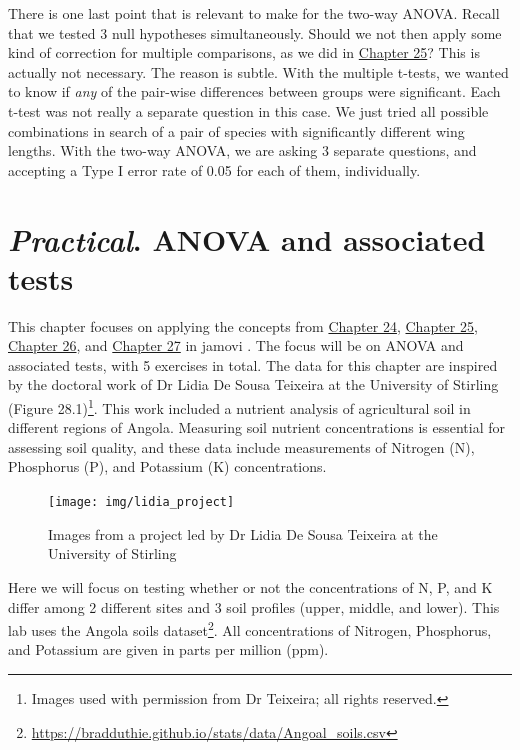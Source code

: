 \documentclass[
]{scrbook}
\begin{document}
There is one last point that is relevant to make for the two-way ANOVA.
Recall that we tested 3 null hypotheses simultaneously.
Should we not then apply some kind of correction for multiple comparisons, as we did in \protect\hyperlink{Chapter_25}{Chapter 25}?
This is actually not necessary.
The reason is subtle.
With the multiple t-tests, we wanted to know if \emph{any} of the pair-wise differences between groups were significant.
Each t-test was not really a separate question in this case.
We just tried all possible combinations in search of a pair of species with significantly different wing lengths.
With the two-way ANOVA, we are asking 3 separate questions, and accepting a Type I error rate of 0.05 for each of them, individually.

\hypertarget{Chapter_28}{%
\chapter{\texorpdfstring{\emph{Practical}. ANOVA and associated tests}{Practical. ANOVA and associated tests}}\label{Chapter_28}}

This chapter focuses on applying the concepts from \protect\hyperlink{Chapter_24}{Chapter 24}, \protect\hyperlink{Chapter_25}{Chapter 25}, \protect\hyperlink{Chapter_26}{Chapter 26}, and \protect\hyperlink{Chapter_27}{Chapter 27} in jamovi \citep{Jamovi2022}.
The focus will be on ANOVA and associated tests, with 5 exercises in total.
The data for this chapter are inspired by the doctoral work of Dr Lidia De Sousa Teixeira at the University of Stirling (Figure 28.1)\footnote{Images used with permission from Dr Teixeira; all rights reserved.}.
This work included a nutrient analysis of agricultural soil in different regions of Angola.
Measuring soil nutrient concentrations is essential for assessing soil quality, and these data include measurements of Nitrogen (N), Phosphorus (P), and Potassium (K) concentrations.

\begin{figure}
\texttt{[image: img/lidia\_project]} \caption{Images from a project led by Dr Lidia De Sousa Teixeira at the University of Stirling}\label{fig:unnamed-chunk-126}
\end{figure}

Here we will focus on testing whether or not the concentrations of N, P, and K differ among 2 different sites and 3 soil profiles (upper, middle, and lower).
This lab uses the Angola soils dataset\footnote{\href{https://bradduthie.github.io/stats/data/Angola_soils.csv}{https://bradduthie.github.io/stats/data/Angoal\_soils.csv}}.
All concentrations of Nitrogen, Phosphorus, and Potassium are given in parts per million (ppm).
\end{document}
